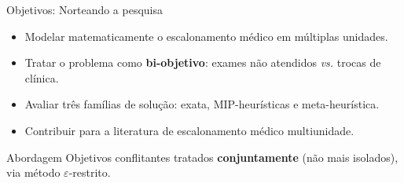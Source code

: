 \begin{frame}{Objetivos: Norteando a pesquisa}

    \begin{block}{}
        \begin{itemize}
            \item Modelar matematicamente o escalonamento médico em múltiplas unidades.
            \item Tratar o problema como \textbf{bi-objetivo}: exames não atendidos \emph{vs.} trocas de clínica.
            \item Avaliar três famílias de solução: exata, MIP-heurísticas e meta-heurística.
            \item Contribuir para a literatura de escalonamento médico multiunidade.
        \end{itemize}
    \end{block}

    \begingroup
    \begin{block}{Abordagem}
        Objetivos conflitantes tratados \textbf{conjuntamente} (não mais isolados), via método $\varepsilon$-restrito.
    \end{block}
    \endgroup
\end{frame}
